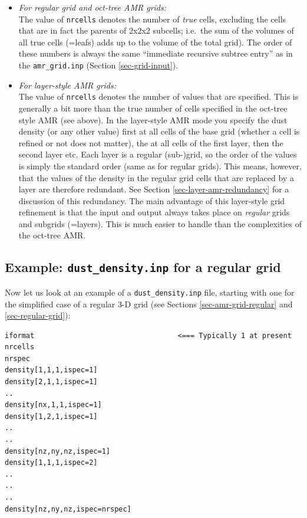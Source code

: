 \documentclass{report}
\newenvironment{asciibox}%
  {\begin{list}{}{%
    \setlength{\topsep}{0.5em}%
    \setlength{\parskip}{0em}%
    \setlength{\parsep}{0em}%
    \setlength{\itemsep}{0em}%
    \setlength{\rightmargin}{0em}%
    \setlength{\leftmargin}{3.0em}%
    \setlength{\labelsep}{1em}%
    \setlength{\labelwidth}{2em}%
  }\normalfont\footnotesize\item}
  {\end{list}}
\begin{document}
\begin{itemize}
\item {\em For regular grid and oct-tree AMR grids:}\\
  The value of {\small\tt nrcells} denotes the number of {\em true} cells,
  excluding the cells that are in fact the parents of 2x2x2 subcells; i.e.\
  the sum of the volumes of all true cells (=leafs) adds up to the volume of
  the total grid). The order of these numbers is always the same ``immediate
  recursive subtree entry'' as in the {\small\tt amr\_grid.inp}
  (Section \ref{sec-grid-input}).
\item {\em For layer-style AMR grids:}\\
  The value of {\small\tt nrcells} denotes the number of values that are
  specified. This is generally a bit more than the true number of cells
  specified in the oct-tree style AMR (see above). In the layer-style AMR
  mode you specify the dust density (or any other value) first at all cells
  of the base grid (whether a cell is refined or not does not matter), the
  at all cells of the first layer, then the second layer etc. Each layer is
  a regular (sub-)grid, so the order of the values is simply the standard
  order (same as for regular grids). This means, however, that the values of
  the density in the regular grid cells that are replaced by a layer are
  therefore redundant. See Section \ref{sec-layer-amr-redundancy} for a
  discussion of this redundancy. The main advantage of this layer-style grid
  refinement is that the input and output always takes place on {\em
    regular} grids and subgrids (=layers). This is much easier to handle
  than the complexities of the oct-tree AMR. 
\end{itemize}

\subsection{Example: {\small\tt dust\_density.inp} for a regular grid}
Now let us look at an example of a {\small\tt dust\_density.inp} file,
starting with one for the simplified case of a regular 3-D grid (see
Sections \ref{sec-amr-grid-regular} and \ref{sec-regular-grid}):
\begin{asciibox}\begin{verbatim}
iformat                                  <=== Typically 1 at present
nrcells
nrspec
density[1,1,1,ispec=1]
density[2,1,1,ispec=1]
..
density[nx,1,1,ispec=1]
density[1,2,1,ispec=1]
..
..
density[nz,ny,nz,ispec=1]
density[1,1,1,ispec=2]
..
..
..
density[nz,ny,nz,ispec=nrspec]
\end{verbatim}\end{asciibox}
\end{document}
